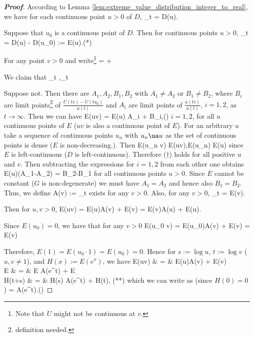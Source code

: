 
\begin{proof}[\bf Proof]
According to Lemma \ref{lem:extreme_value_distribution_integer_to_real}, we have for each continuous point $u>0$ of $D$,
\be
\lim_{t\to\infty} = D(u).
\ee

Suppose that $u_0$ is a continuous point of $D$. Then for continuous points $u>0$,
\be
\lim_{t\to\infty} = D(u) - D(u_0) := E(u).\qquad (*)
\ee

For any point $v>0$ and write\footnote{Note that $U$ might not be continuous at $v$.}
\be
{} =   + 
\ee

We claim that
\be
\lim_{t\to\infty} ,\quad\lim_{t\to\infty}   \qquad {}
\ee

Suppose not. Then there are $A_1,A_2,B_1,B_2$ with $A_1\neq A_2$ or $B_1\neq B_2$, where $B_i$ are limit points\footnote{definition needed.} of $\frac{U(tv) - U(tu_0)}{a(t)}$ and $A_i$ are limit points of $\frac{a(tv)}{a(t)}$, $i=1,2$, as $t\to \infty$. Then we can have
\be
E(uv) = E(u) A_i + B_i,\qquad (\dag)
\ee
$i=1,2$, for all $u$ continuous points of $E$ ($uv$ is also a continuous point of $E$). For an arbitrary $u$ take a sequence of continuous points $u_n$ with $u_n \ua u$ as the set of continuous points is dense ($E$ is non-decreasing.). Then
\be
E(u_n v) \to E(uv),\quad E(u_n) \to E(u)
\ee
since $E$ is left-continuous ($D$ is left-continuous). Therefore ($\dag$) holds for all positive $u$ and $v$. Then subtracting the expressions for $i=1,2$ from each other one obtains
\be
E(u)(A_1-A_2) = B_2-B_1
\ee
for all continuous points $u>0$. Since $E$ cannot be constant ($G$ is non-degenerate) we must have $A_1=A_2$ and hence also $B_1=B_2$. Thus, we define
\be
A(v) := \lim_{t\to\infty}
\ee
exists for any $v>0$. Also, for any $v>0$,
\be
\lim_{t\to\infty} = E(v).
\ee

Then for $u,v>0$,
\be
E(uv) = E(u)A(v) + E(v) = E(v)A(u) + E(u).
\ee

Since $E(u_0) = 0$, we have that for any $v>0$
\be
E(u_0 v) = E(u_0)A(v) + E(v) = E(v)
\ee

Therefore, $E(1) = E(u_0\cdot 1) = E(u_0) = 0$. Hence for $s:=\log u$, $t:=\log v$ ($u,v\neq 1$), and $H(x):= E(e^x)$, we have
\beast
E(uv) & = & E(u)A(v) + E(v) \\
E & = & E A(e^t) + E\\
H(t+s) & = & H(s) A(e^t) + H(t),    \qquad (**)
\eeast
which we can write as (since $H(0) = 0$)
\be
{} =  A(e^t).\qquad (\dag\dag)
\ee


\end{proof}
